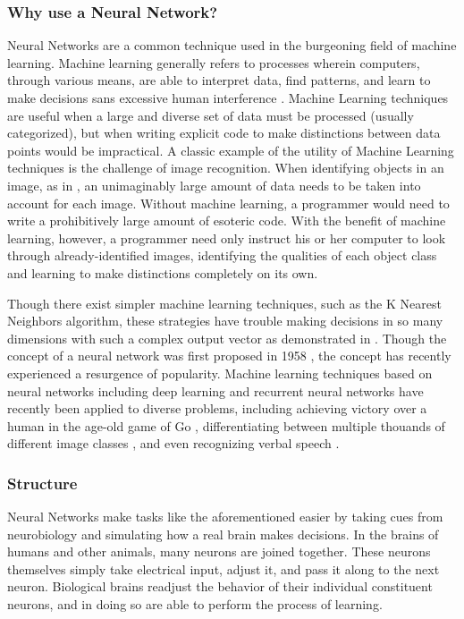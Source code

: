 \documentclass{article}
\begin{document}
\subsubsection{Why use a Neural Network?}
Neural Networks are a common technique used in the burgeoning field of machine learning. Machine learning generally refers to processes wherein computers, through various means, are able to interpret data, find patterns, and learn to make decisions sans excessive human interference \cite{sasml}. Machine Learning techniques are useful when a large and diverse set of data must be processed (usually categorized), but when writing explicit code to make distinctions between data points would be impractical. A classic example of the utility of Machine Learning techniques is the challenge of image recognition. When identifying objects in an image, as in \cite{hinton12}, an unimaginably large amount of data needs to be taken into account for each image. Without machine learning, a programmer would need to write a prohibitively large amount of esoteric code. With the benefit of machine learning, however, a programmer need only instruct his or her computer to look through already-identified images, identifying the qualities of each object class and learning to make distinctions completely on its own.

Though there exist simpler machine learning techniques, such as the K Nearest Neighbors algorithm, these strategies have trouble making decisions in so many dimensions with such a complex output vector as demonstrated in \cite{knnic}. Though the concept of a neural network was first proposed in 1958 \cite{rosenblatt58}, the concept has recently experienced a resurgence of popularity. Machine learning techniques based on neural networks including deep learning \cite{mitdeeplearning} and recurrent neural networks \cite{recurrentsurvey} have recently been applied to diverse problems, including achieving victory over a human in the age-old game of Go \cite{go1}\cite{go2}, differentiating between multiple thouands of different image classes \cite{hinton12}, and even recognizing verbal speech \cite{rnnspoken}.

\subsubsection{Structure}
Neural Networks make tasks like the aforementioned easier by taking cues from neurobiology and simulating how a real brain makes decisions. In the brains of humans and other animals, many neurons are joined together. These neurons themselves simply take electrical input, adjust it, and pass it along to the next neuron. Biological brains readjust the behavior of their individual constituent neurons, and in doing so are able to perform the process of learning.
\end{document}

